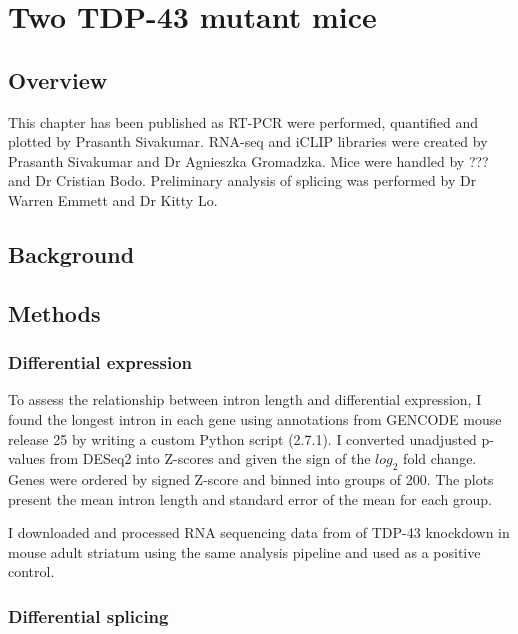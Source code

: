 \chapter{Two TDP-43 mutant mice}

\section{Overview}

This chapter has been published as \citep{Fratta2018}
RT-PCR were performed, quantified and plotted by Prasanth Sivakumar.
RNA-seq and iCLIP libraries were created by Prasanth Sivakumar and Dr Agnieszka Gromadzka.
Mice were handled by ??? and Dr Cristian Bodo.
Preliminary analysis of splicing was performed by Dr Warren Emmett and Dr Kitty Lo.





\section{Background}




\section{Methods}

\subsection{Differential expression}
To assess the relationship between intron length and differential expression, I found the longest intron in each gene using annotations from GENCODE mouse release 25 \citep{Harrow2012} by writing a custom Python script (2.7.1). I converted unadjusted p-values from DESeq2 into Z-scores and given the sign of the $log_2$ fold change. Genes were ordered by signed Z-score and binned into groups of  200. The plots present the mean intron length and  standard error  of  the mean  for each group.  

I downloaded and processed RNA sequencing data from of TDP-43 knockdown in mouse adult striatum \citep{Polymenidou2011} using the same analysis pipeline and used as a positive control.


\subsection{Differential splicing}

